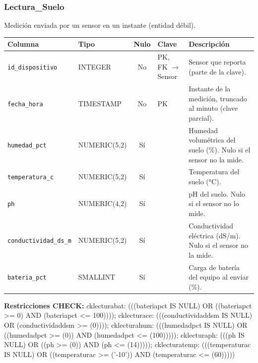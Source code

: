 \documentclass[11pt,letterpaper]{article}
\newcommand{\tbus}{\textunderscore\allowbreak}
\newcommand{\tb}[1]{{\ttfamily\let\_\tbus #1}}
\begin{document}
\subsubsection*{Lectura\_Suelo}
Medición enviada por un sensor en un instante (entidad débil).
{\footnotesize
\begin{longtable}{>{\raggedright\arraybackslash}p{3.3cm}>{\raggedright\arraybackslash}p{2.5cm}c>{\raggedright\arraybackslash}p{2.2cm}>{\raggedright\arraybackslash}p{6.1cm}}
\toprule
\textbf{Columna} & \textbf{Tipo} & \textbf{Nulo} & \textbf{Clave} & \textbf{Descripción} \\
\midrule
\endhead
\texttt{id\_dispositivo} & INTEGER & No & PK, FK $\to$ Sensor & Sensor que reporta (parte de la clave). \\
\texttt{fecha\_hora} & TIMESTAMP & No & PK & Instante de la medición, truncado al minuto (clave parcial). \\
\texttt{humedad\_pct} & NUMERIC(5,2) & Sí &  & Humedad volumétrica del suelo (\%). Nulo si el sensor no la mide. \\
\texttt{temperatura\_c} & NUMERIC(5,2) & Sí &  & Temperatura del suelo (°C). \\
\texttt{ph} & NUMERIC(4,2) & Sí &  & pH del suelo. Nulo si el sensor no lo mide. \\
\texttt{conductividad\_ds\_m} & NUMERIC(5,2) & Sí &  & Conductividad eléctrica (dS/m). Nulo si el sensor no la mide. \\
\texttt{bateria\_pct} & SMALLINT & Sí &  & Carga de batería del equipo al enviar (\%). \\
\bottomrule
\end{longtable}}
{\footnotesize\raggedright\textbf{Restricciones CHECK:} \tb{ck\_lectura\_bat}: \tb{(((bateria\_pct IS NULL) OR ((bateria\_pct >= 0) AND (bateria\_pct <= 100))))}; \tb{ck\_lectura\_ce}: \tb{(((conductividad\_ds\_m IS NULL) OR (conductividad\_ds\_m >= (0))))}; \tb{ck\_lectura\_hum}: \tb{(((humedad\_pct IS NULL) OR ((humedad\_pct >= (0)) AND (humedad\_pct <= (100)))))}; \tb{ck\_lectura\_ph}: \tb{(((ph IS NULL) OR ((ph >= (0)) AND (ph <= (14)))))}; \tb{ck\_lectura\_temp}: \tb{(((temperatura\_c IS NULL) OR ((temperatura\_c >= ('-10')) AND (temperatura\_c <= (60)))))}\par}
\medskip
\end{document}
